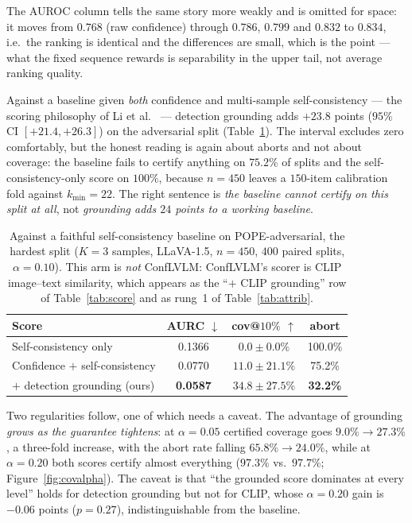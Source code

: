 \documentclass[review,number,doubleblind]{elsarticle}
\theoremstyle{plain}
\theoremstyle{definition}
\theoremstyle{remark}
\begin{document}
The AUROC column tells the same story more weakly and is omitted for space: it moves from
$0.768$ (raw confidence) through $0.786$, $0.799$ and $0.832$ to $0.834$, i.e.\ the ranking is
identical and the differences are small, which is the point --- what the fixed sequence rewards
is separability in the upper tail, not average ranking quality.

Against a baseline given \emph{both} confidence and multi-sample self-consistency --- the
scoring philosophy of Li et al.~\cite{conflvlm} --- detection grounding adds $+23.8$ points
($95\%$ CI $[+21.4,+26.3]$) on the adversarial split (Table~\ref{tab:selfcons}). The interval
excludes zero comfortably, but the honest reading is again about aborts and not about coverage:
the baseline fails to certify anything on $75.2\%$ of splits and the self-consistency-only score
on $100\%$, because $n=450$ leaves a $150$-item calibration fold against $k_{\min}=22$. The
right sentence is \emph{the baseline cannot certify on this split at all}, not \emph{grounding
adds $24$ points to a working baseline}.

\begin{table}[t]
\centering
\caption{Against a faithful self-consistency baseline on POPE-adversarial, the hardest
split ($K=3$ samples, LLaVA-1.5, $n=450$, $400$ paired splits, $\alpha=0.10$). This arm is
\emph{not} ConfLVLM: ConfLVLM's scorer is CLIP image--text similarity, which appears as the
``$+$ CLIP grounding'' row of Table~\ref{tab:score} and as rung~1 of Table~\ref{tab:attrib}.}
\label{tab:selfcons}
\small
\begin{tabular}{lccc}
\toprule
Score & AURC $\downarrow$ & cov@$10\%$ $\uparrow$ & abort\\
\midrule
Self-consistency only & 0.1366 & $0.0\pm0.0\%$ & 100.0\%\\
Confidence $+$ self-consistency & 0.0770 & $11.0\pm21.1\%$ & \phantom{0}75.2\%\\
\quad $+$ detection grounding (ours) & \textbf{0.0587} & $\mathbf{34.8\pm27.5\%}$ & \phantom{0}\textbf{32.2\%}\\
\bottomrule
\end{tabular}
\end{table}

Two regularities follow, one of which needs a caveat. The advantage of grounding \emph{grows as
the guarantee tightens}: at $\alpha=0.05$ certified coverage goes $9.0\%\to27.3\%$, a
three-fold increase, with the abort rate falling $65.8\%\to24.0\%$, while at $\alpha=0.20$ both
scores certify almost everything ($97.3\%$ vs.\ $97.7\%$; Figure~\ref{fig:covalpha}). The
caveat is that ``the grounded score dominates at every level'' holds for detection grounding but
not for CLIP, whose $\alpha=0.20$ gain is $-0.06$ points ($p=0.27$), indistinguishable from the
baseline.
\end{document}
